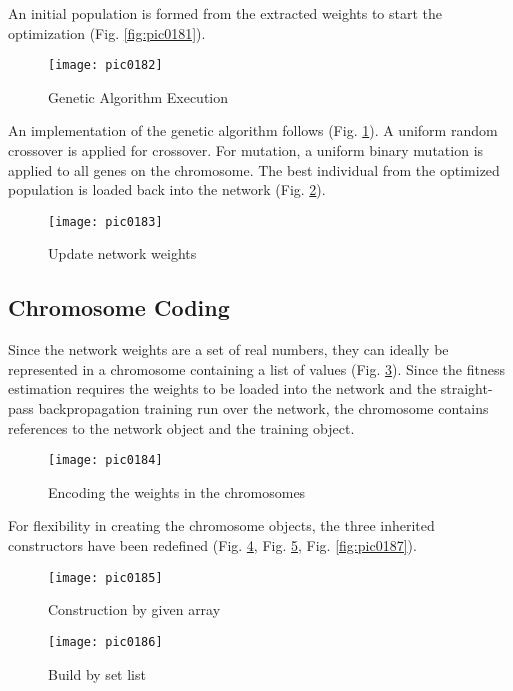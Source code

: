 An initial population is formed from the extracted weights to start the optimization (Fig. \ref{fig:pic0181}).

\begin{figure}[h]
\centering
\texttt{[image: pic0182]}
\caption{Genetic Algorithm Execution}
\label{fig:pic0182}
\end{figure}
\FloatBarrier

An implementation of the genetic algorithm follows (Fig. \ref{fig:pic0182}). A uniform random crossover is applied for crossover. For mutation, a uniform binary mutation is applied to all genes on the chromosome. The best individual from the optimized population is loaded back into the network (Fig. \ref{fig:pic0183}).

\begin{figure}[h]
\centering
\texttt{[image: pic0183]}
\caption{Update network weights}
\label{fig:pic0183}
\end{figure}
\FloatBarrier

\subsection{Chromosome Coding}

Since the network weights are a set of real numbers, they can ideally be represented in a chromosome containing a list of values (Fig. \ref{fig:pic0184}). Since the fitness estimation requires the weights to be loaded into the network and the straight-pass backpropagation training run over the network, the chromosome contains references to the network object and the training object.

\begin{figure}[h]
\centering
\texttt{[image: pic0184]}
\caption{Encoding the weights in the chromosomes}
\label{fig:pic0184}
\end{figure}
\FloatBarrier

For flexibility in creating the chromosome objects, the three inherited constructors have been redefined (Fig. \ref{fig:pic0185}, Fig. \ref{fig:pic0186}, Fig. \ref{fig:pic0187}).

\begin{figure}[h]
\centering
\texttt{[image: pic0185]}
\caption{Construction by given array}
\label{fig:pic0185}
\end{figure}
\FloatBarrier

\begin{figure}[h]
\centering
\texttt{[image: pic0186]}
\caption{Build by set list}
\label{fig:pic0186}
\end{figure}
\FloatBarrier

